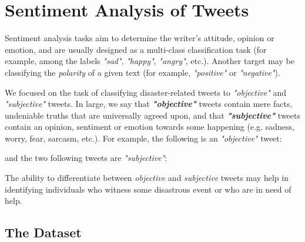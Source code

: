 \documentclass[letterpaper,twocolumn,10pt]{article}
\begin{document}
\section{Sentiment Analysis of Tweets}  \label{mission2}

Sentiment analysis tasks aim to determine the writer's attitude, opinion or emotion, and are usually designed as a multi-class classification task (for example, among the labels \textit{"sad"}, \textit{"happy"}, \textit{"angry"}, etc.). Another target may be classifying the \textit{polarity} of a given text (for example, \textit{"positive"} or \textit{"negative"}).

We focused on the task of classifying disaster-related tweets to \textit{"objective"} and \textit{"subjective"} tweets. In large, we say that \textbf{\textit{"objective"}} tweets contain mere facts, undeniable truths that are universally agreed upon, and that \textbf{\textit{"subjective"}} tweets contain an opinion, sentiment or emotion towards some happening (e.g. sadness, worry, fear, sarcasm, etc.). For example, the following is an \textit{"objective"} tweet:

\begin{center}
	\parbox{190pt}{}
\end{center}

and the two following tweets are \textit{"subjective"}:

\begin{center}
	\parbox{190pt}{}
\end{center}

\begin{center}
	\parbox{190pt}{}
\end{center}

The ability to differentiate between \textit{objective} and \textit{subjective} tweets may help in identifying individuals who witness some disastrous event or who are in need of help.

\subsection{The Dataset}
\end{document}
